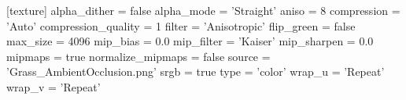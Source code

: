 [texture]
alpha_dither = false
alpha_mode = 'Straight'
aniso = 8
compression = 'Auto'
compression_quality = 1
filter = 'Anisotropic'
flip_green = false
max_size = 4096
mip_bias = 0.0
mip_filter = 'Kaiser'
mip_sharpen = 0.0
mipmaps = true
normalize_mipmaps = false
source = 'Grass_AmbientOcclusion.png'
srgb = true
type = 'color'
wrap_u = 'Repeat'
wrap_v = 'Repeat'